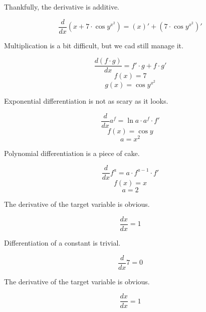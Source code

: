 \documentclass[12pt]{article}
\begin{document}
Thankfully, the derivative is additive.

$$ \frac{d}{dx} \left( x  +  7  \cdot \cos  y ^{ x ^{ 2 }}\right) = \left( x \right)' + \left( 7  \cdot \cos  y ^{ x ^{ 2 }}\right)' $$

Multiplication is a bit difficult, but we cad still manage it.

$$ \frac{d (f \cdot g)}{dx} = f' \cdot g + f \cdot g' $$
$$ f(x) =  7  $$
 $$ g(x) = \cos  y ^{ x ^{ 2 }} $$

Exponential differentiation is not as scary as it looks.

$$ \frac{d}{dx} a^f = \ln{a} \cdot a^f \cdot f' $$
$$ f(x) = \cos  y  $$
 $$ a =  x ^{ 2 } $$

Polynomial differentiation is a piece of cake.

$$ \frac{d}{dx} f^{a} = a \cdot f^{a - 1} \cdot f' $$
$$ f(x) =  x  $$
 $$ a =  2  $$

The derivative of the target variable is obvious.

$$ \frac{dx}{dx} = 1 $$

Differentiation of a constant is trivial.

$$ \frac{d}{dx} 7 = 0 $$

The derivative of the target variable is obvious.

$$ \frac{dx}{dx} = 1 $$
\end{document}
